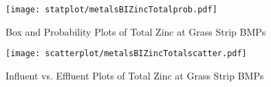        \begin{figure}[hb]   %
            \centering
            \texttt{[image: statplot/metalsBIZincTotalprob.pdf]}
            \caption{Box and Probability Plots of Total Zinc at Grass Strip BMPs}
        \end{figure}         %
        
        
        \begin{figure}[hb]   %
            \centering
            \texttt{[image: scatterplot/metalsBIZincTotalscatter.pdf]}
            \caption{Influent vs. Effluent Plots of Total Zinc at Grass Strip BMPs}
        \end{figure}         %
        \clearpage
        